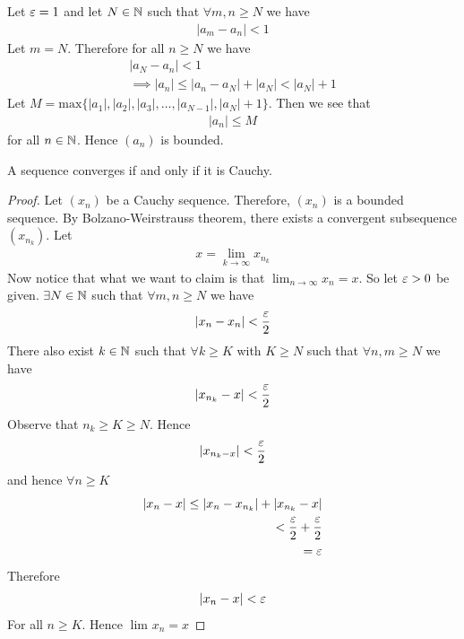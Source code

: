 \begin{theorem}
	Let $\e = 1$ and let $N \in \mathbb{N}$ such that $\forall m,n \ge N$ we have 
	\begin{align}
		\left|a_m - a_n\right| < 1
	\end{align}
	Let $m = N$. Therefore for all $n \ge N$ we have 
	\begin{align}
		\left|a_N - a_n\right| < 1 \\
		\implies \left|a_n\right| \le \left|a_n - a_N\right| + \left|a_N\right| < \left|a_N\right| + 1
	\end{align}
	Let $M = \text{max}\{\left|a_1\right|, \left|a_2\right|, \left|a_3\right|, \ldots, \left|a_{N-1}\right|, \left|a_N\right| + 1\} $. Then we see that 
	\begin{align}
		\left|a_n\right| \le M
	\end{align}
	for all $n \in \mathbb{N}$. Hence $\left( a_n \right)$ is bounded.
\end{theorem}

\begin{theorem}
	A sequence converges if and only if it is Cauchy.
\end{theorem}

\begin{proof}
	Let $\left( x_n \right) $ be a Cauchy sequence. Therefore, $\left( x_n \right) $ is a bounded sequence. By Bolzano-Weirstrauss theorem, there exists a convergent subsequence $\left( x_{n_{k}} \right) $. Let 
	\begin{align}
		x = \lim_{k \to \infty} x_{n_{k}}
	\end{align}
	Now notice that what we want to claim is that $\lim_{n \to \infty}x_n = x$. So let $\e > 0$ be given. $\exists N \in \mathbb{N}$ such that $\forall m,n \ge N$ we have
	\begin{align}
		\left|x_n - x_n\right| < \frac{\e}{2}
	\end{align}
	There also exist $k \in \mathbb{N}$ such that $\forall k \ge K$ with $K \ge N$ such that $\forall n, m \ge N$ we have 
	\begin{align}
		\left|x_{n_{k}} - x\right| < \frac{\e}{2}
	\end{align}
	Observe that $n_{k} \ge K \ge  N$. Hence 
	\begin{align}
		\left|x_{n_{k} - x}\right| < \frac{\e}{2}
	\end{align}
	and hence $\forall n \ge K$ 
	\begin{align}
		\left|x_n -x\right| \le \left|x_{n} - x_{n_{k}}\right| + \left|x_{n_{k}} - x\right|\\
		< \frac{\e}{2} + \frac{\e}{2} \\
		= \e
	\end{align}
	Therefore
	\begin{align}
		\left|x_n - x\right| < \e
	\end{align}
	For all $n \ge K$. Hence $\lim_{} x_n = x$
\end{proof}

